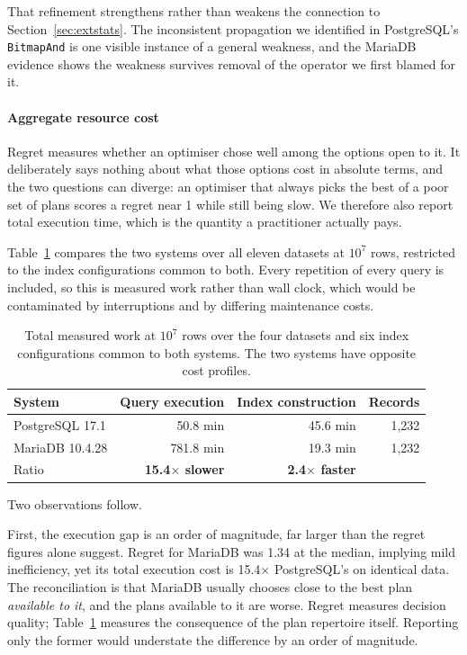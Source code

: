 \documentclass[preprint,12pt,authoryear]{elsarticle}
\begin{document}
That refinement strengthens rather than weakens the connection to
Section~\ref{sec:extstats}. The inconsistent propagation we identified
in PostgreSQL's \texttt{BitmapAnd} is one visible instance of a general
weakness, and the MariaDB evidence shows the weakness survives removal
of the operator we first blamed for it.

\paragraph{Aggregate resource cost}
Regret measures whether an optimiser chose well among the options open to it.
It deliberately says nothing about what those options cost in absolute
terms, and the two questions can diverge: an optimiser that always picks
the best of a poor set of plans scores a regret near 1 while still being
slow. We therefore also report total execution time, which is the
quantity a practitioner actually pays.

Table~\ref{tab:resourcecost} compares the two systems over all eleven
datasets at $10^7$ rows, restricted to the index configurations common
to both. Every repetition of every query is included, so this is
measured work rather than wall clock, which would be contaminated by
interruptions and by differing maintenance costs.

\begin{table}[htbp]
\centering
\caption{Total measured work at $10^7$ rows over the four datasets and
six index configurations common to both systems. The two systems have
opposite cost profiles.}
\label{tab:resourcecost}
\small
\begin{tabular}{@{}lrrr@{}}
\toprule
System & Query execution & Index construction & Records \\
\midrule
PostgreSQL 17.1 & 50.8 min & 45.6 min & 1{,}232 \\
MariaDB 10.4.28 & 781.8 min & 19.3 min & 1{,}232 \\
\midrule
Ratio & \textbf{15.4$\times$ slower} & \textbf{2.4$\times$ faster} & \\
\bottomrule
\end{tabular}
\end{table}

Two observations follow.

First, the execution gap is an order of magnitude, far larger than the
regret figures alone suggest. Regret for MariaDB was 1.34 at the median,
implying mild inefficiency, yet its total execution cost is 15.4$\times$
PostgreSQL's on identical data. The reconciliation is that MariaDB
usually chooses close to the best plan \emph{available to it}, and the
plans available to it are worse. Regret measures decision quality;
Table~\ref{tab:resourcecost} measures the consequence of the plan
repertoire itself. Reporting only the former would understate the
difference by an order of magnitude.
\end{document}
